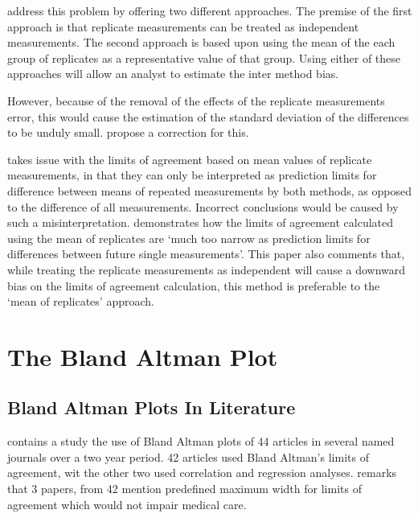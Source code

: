 \documentclass[12pt, a4paper]{report}
\begin{document}
	\citet*{BA86} address this problem by offering two different
	approaches. The premise of the first approach is that replicate
	measurements can be treated as independent measurements. The
	second approach is based upon using the mean of the each group of
	replicates as a representative value of that group. Using either
	of these approaches will allow an analyst to estimate the inter
	method bias.
	
	
	However, because of the removal of the effects of the replicate
	measurements error, this would cause the estimation of the
	standard deviation of the differences to be unduly small.
	\citet*{BA86} propose a correction for this.
	
	\citet{BXC2008} takes issue with the limits of agreement based on
	mean values of replicate measurements, in that they can only be interpreted as prediction
	limits for difference between means of repeated measurements by
	both methods, as opposed to the difference of all measurements.
	Incorrect conclusions would be caused by such a misinterpretation.
	\citet{BXC2008} demonstrates how the limits of agreement
	calculated using the mean of replicates are `much too narrow as
	prediction limits for differences between future single
	measurements'. This paper also comments that, while treating the
	replicate measurements as independent will cause a downward bias
	on the limits of agreement calculation, this method is preferable
	to the `mean of replicates' approach.
	
	
	
	
	\chapter{The Bland Altman Plot}
	\section{Bland Altman Plots In Literature}
	\citet{mantha} contains a study the use of Bland Altman plots of
	44 articles in several named journals over a two year period. 42
	articles used Bland Altman's limits of agreement, wit the other
	two used correlation and regression analyses. \citet{mantha}
	remarks that 3 papers, from 42 mention predefined maximum width
	for limits of agreement which would not impair medical care.
	
\end{document}
